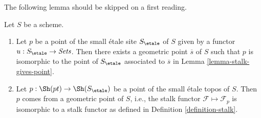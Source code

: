 \noindent
The following lemma should be skipped on a first reading.

\begin{lemma}
\label{lemma-points-small-etale-site}
Let $S$ be a scheme.
\begin{enumerate}
\item Let $p$ be a point of the small \'etale site
$S_\etale$ of $S$ given by a functor
$u : S_\etale \to \textit{Sets}$.
Then there exists a geometric point $\overline{s}$ of $S$ such that
$p$ is isomorphic to the point of $S_\etale$ associated to
$\overline{s}$ in
Lemma \ref{lemma-stalk-gives-point}.
\item Let $p : \Sh(pt) \to \Sh(S_\etale)$ be a point
of the small \'etale topos of $S$. Then $p$ comes from a geometric point
of $S$, i.e., the stalk functor $\mathcal{F} \mapsto \mathcal{F}_p$
is isomorphic to a stalk functor as defined in
Definition \ref{definition-stalk}.
\end{enumerate}
\end{lemma}

